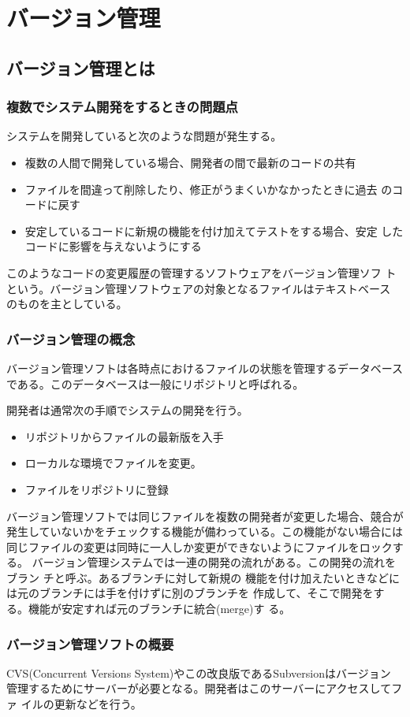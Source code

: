 \chapter{バージョン管理}
\section{バージョン管理とは}
\subsection{複数でシステム開発をするときの問題点}
システムを開発していると次のような問題が発生する。
\begin{itemize}
 \item 複数の人間で開発している場合、開発者の間で最新のコードの共有
 \item ファイルを間違って削除したり、修正がうまくいかなかったときに過去
       のコードに戻す
 \item 安定しているコードに新規の機能を付け加えてテストをする場合、安定
       したコードに影響を与えないようにする
\end{itemize}
このようなコードの変更履歴の管理するソフトウェアをバージョン管理ソフ
トという。バージョン管理ソフトウェアの対象となるファイルはテキストベース
のものを主としている。
\subsection{バージョン管理の概念}
バージョン管理ソフトは各時点におけるファイルの状態を管理するデータベース
である。このデータベースは一般にリポジトリと呼ばれる。

開発者は通常次の手順でシステムの開発を行う。
\begin{itemize}
 \item リポジトリからファイルの最新版を入手
 \item ローカルな環境でファイルを変更。
 \item ファイルをリポジトリに登録
\end{itemize}
バージョン管理ソフトでは同じファイルを複数の開発者が変更した場合、競合が
発生していないかをチェックする機能が備わっている。この機能がない場合には
同じファイルの変更は同時に一人しか変更ができないようにファイルをロックす
る。
バージョン管理システムでは一連の開発の流れがある。この開発の流れをブラン
チと呼ぶ。あるブランチに対して新規の
機能を付け加えたいときなどには元のブランチには手を付けずに別のブランチを
作成して、そこで開発をする。機能が安定すれば元のブランチに統合(merge)す
る。
\subsection{バージョン管理ソフトの概要}
CVS(Concurrent Versions System)やこの改良版であるSubversionはバージョン
管理するためにサーバーが必要となる。開発者はこのサーバーにアクセスしてファ
イルの更新などを行う。

